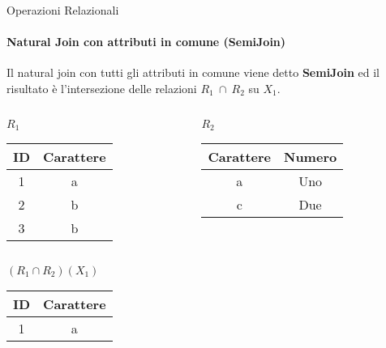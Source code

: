     \begin{frame}{Operazioni Relazionali}
        \framesubtitle{Natural Join con attributi in comune (SemiJoin)}
        Il natural join con tutti gli attributi in comune viene detto \textbf{SemiJoin} ed il risultato \`e l'intersezione delle relazioni $R_1~\cap~R_2$ su $X_1$.
        \begin{columns}
            \begin{column}{0.48\textwidth}
                \centering
                {\small $R_1$}
                \newline
        \begin{tabular}{|c|c|}
            \hline
            \rowcolor{cyan!30}ID & Carattere \\
            \hline
            1 & \cellcolor{red!30}a \\ \hline
            2 & b \\ \hline
            3 & b \\ \hline
            \end{tabular}
            \end{column}
            \begin{column}{0.48\textwidth}
                \centering
                {\small $R_2$}
                \newline
                \begin{tabular}{|c|c|}
                    \hline
                    \rowcolor{cyan!30} Carattere & Numero \\ \hline
                    \cellcolor{red!30}a & Uno \\ \hline
                    c & Due \\ \hline
                    \end{tabular}
            \end{column}
        \end{columns}
        \vspace{.1cm}
        \centering
        \pause
        {\small $(R_1 \cap R_2)(X_1)$
        \begin{tabular}{|c|c|}
            \hline
            \rowcolor{cyan!30} ID & Carattere \\ \hline
            1 & a \\ \hline
            \end{tabular}}
    \end{frame}

